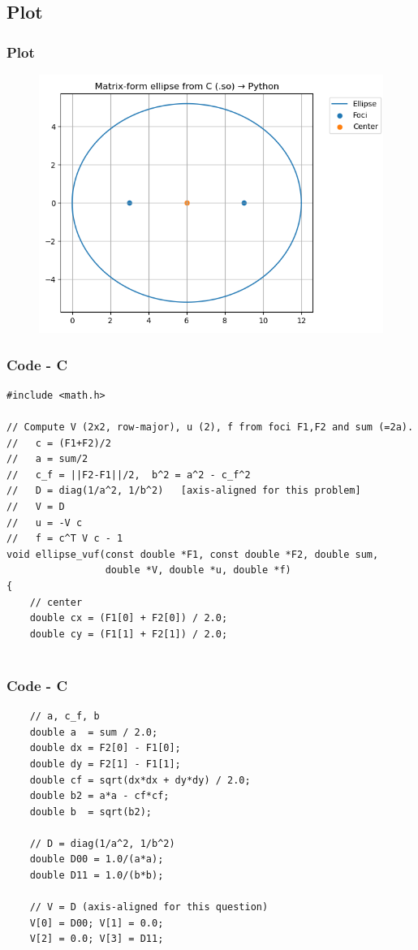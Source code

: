 \documentclass{beamer}
\theoremstyle{remark}
\numberwithin{equation}{section}
\begin{document}
\subsection{Plot}
\begin{frame}
    \frametitle{Plot}
\begin{figure}[H]
   \centering
   \includegraphics[width=0.8\columnwidth]{figs/ellipse.png}
   \caption{}
   \label{}
   \end{figure}
\end{frame}

\begin{frame}[fragile]
    \frametitle{Code - C}
    \begin{lstlisting}
#include <math.h>

// Compute V (2x2, row-major), u (2), f from foci F1,F2 and sum (=2a).
//   c = (F1+F2)/2
//   a = sum/2
//   c_f = ||F2-F1||/2,  b^2 = a^2 - c_f^2
//   D = diag(1/a^2, 1/b^2)   [axis-aligned for this problem]
//   V = D
//   u = -V c
//   f = c^T V c - 1
void ellipse_vuf(const double *F1, const double *F2, double sum,
                 double *V, double *u, double *f)
{
    // center
    double cx = (F1[0] + F2[0]) / 2.0;
    double cy = (F1[1] + F2[1]) / 2.0;


    \end{lstlisting}
    \end{frame}

    \begin{frame}[fragile]
    \frametitle{Code - C}
    \begin{lstlisting}
    // a, c_f, b
    double a  = sum / 2.0;
    double dx = F2[0] - F1[0];
    double dy = F2[1] - F1[1];
    double cf = sqrt(dx*dx + dy*dy) / 2.0;
    double b2 = a*a - cf*cf;
    double b  = sqrt(b2);

    // D = diag(1/a^2, 1/b^2)
    double D00 = 1.0/(a*a);
    double D11 = 1.0/(b*b);

    // V = D (axis-aligned for this question)
    V[0] = D00; V[1] = 0.0;
    V[2] = 0.0; V[3] = D11;

    \end{lstlisting}
    \end{frame}
\end{document}
